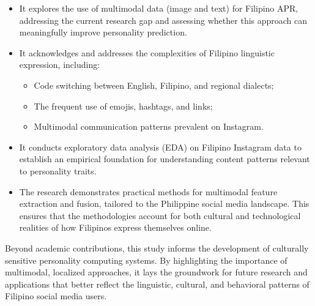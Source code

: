 \begin{itemize}
	\item It explores the use of multimodal data (image and text) for Filipino APR, addressing the current research gap and assessing whether this approach can meaningfully improve personality prediction.
	
	\item It acknowledges and addresses the complexities of Filipino linguistic expression, including:
	\begin{itemize}
		\item Code switching between English, Filipino, and regional dialects;
		\item The frequent use of emojis, hashtags, and links;
		\item Multimodal communication patterns prevalent on Instagram.
	\end{itemize}
	
	\item It conducts exploratory data analysis (EDA) on Filipino Instagram data to establish an empirical foundation for understanding content patterns relevant to personality traits.
	
	\item The research demonstrates practical methods for multimodal feature extraction and fusion, tailored to the Philippine social media landscape. This ensures that the methodologies account for both cultural and technological realities of how Filipinos express themselves online.
\end{itemize}

Beyond academic contributions, this study informs the development of culturally sensitive personality computing systems. By highlighting the importance of multimodal, localized approaches, it lays the groundwork for future research and applications that better reflect the linguistic, cultural, and behavioral patterns of Filipino social media users.




